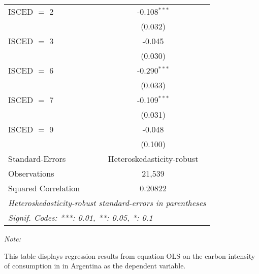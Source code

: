 \begin{table}[htbp!]
\begin{adjustbox}{width = 1\textwidth, max height = 0.95\textheight, center}
\begin{threeparttable}[b]
\begin{tabular}{lc}
            ISCED $=$ 2         & -0.108$^{***}$\\   
                                & (0.032)\\   
            ISCED $=$ 3         & -0.045\\   
                                & (0.030)\\   
            ISCED $=$ 6         & -0.290$^{***}$\\   
                                & (0.033)\\   
            ISCED $=$ 7         & -0.109$^{***}$\\   
                                & (0.031)\\   
            ISCED $=$ 9         & -0.048\\   
                                & (0.100)\\   
            \midrule 
            Standard-Errors     & Heteroskedasticity-robust \\   
            Observations        & 21,539\\  
            Squared Correlation & 0.20822\\  
            \midrule \midrule
            \multicolumn{2}{l}{\emph{Heteroskedasticity-robust standard-errors in parentheses}}\\
            \multicolumn{2}{l}{\emph{Signif. Codes: ***: 0.01, **: 0.05, *: 0.1}}\\
         \end{tabular}
         
         \begin{tablenotes}\item \medskip \textit{Note:}
            \item This table displays regression results from equation OLS on the carbon intensity of consumption in  in Argentina as the dependent variable. 
         \end{tablenotes}
      \end{threeparttable}
   \end{adjustbox}
\end{table}


